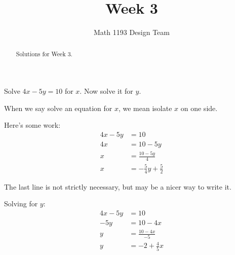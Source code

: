 \documentclass[noauthor]{ximera}
\title{Week 3}
\author{Math 1193 Design Team}
\begin{document}
\begin{abstract}
    Solutions for Week 3.
\end{abstract}
\maketitle

\begin{problem}
Solve \(4x - 5y = 10\) for \(x\). Now solve it for \(y\).

\begin{explanation}
When we say solve an equation for \(x\), we mean isolate \(x\) on one side.

Here's some work:
\begin{align*}
    4x - 5y & = 10 \\
    4x & = 10 - 5y \\
    x & = \frac{10 - 5y}{4} \\
    x & = -\frac{5}{4}y + \frac{5}{2}
\end{align*}

The last line is not strictly necessary, but may be a nicer way to write it.

Solving for \(y\):
\begin{align*}
    4x - 5y & = 10 \\
    -5y & = 10 - 4x \\
    y & = \frac{10 -4x}{-5} \\
    y & = -2 + \frac{4}{5}x
\end{align*}
\end{explanation}
\end{problem}
\end{document}
